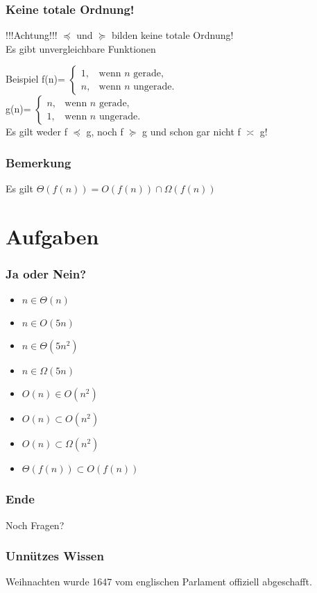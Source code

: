 \documentclass{beamer}
\begin{document}
\begin{frame}
	\frametitle{Keine totale Ordnung!}
	\begin{block}{!!!Achtung!!!}
		$\preceq$ und $\succeq$ bilden keine totale Ordnung! \\
		Es gibt unvergleichbare Funktionen
	\end{block}
	\begin{block}{Beispiel}
		f(n)=
		$\begin{cases}
			1,  & \text{wenn }n\text{ gerade,}\\
 		 	n, & \text{wenn }n\text{ ungerade.}
		\end{cases}$ \\
		g(n)=
		$\begin{cases}
			n,  & \text{wenn }n\text{ gerade,}\\
 		 	1, & \text{wenn }n\text{ ungerade.}
		\end{cases}$ \\
		Es gilt weder f $\preceq$ g, noch f $\succeq$ g und schon gar nicht f $\asymp$ g!
	\end{block}
\end{frame}

\begin{frame}
	\frametitle{Bemerkung}
	\begin{block}{Es gilt}
		$\Theta(f(n)) = O(f(n)) \cap \Omega(f(n))$ 
	\end{block}
\end{frame}

\section{Aufgaben}
\begin{frame}
	\frametitle{Ja oder Nein?}
	\begin{itemize}
		\item $n \in \Theta(n)$ \pause
		\item $n \in O(5n)$\pause
		\item $n \in \Theta(5n^2)$\pause
		\item $n \in \Omega(5n)$\pause
		\item $O(n) \in O(n^2)$\pause
		\item $O(n) \subset O(n^2)$\pause
		\item $O(n) \subset \Omega(n^2)$\pause
		\item $\Theta(f(n)) \subset O(f(n))$
	\end{itemize}
\end{frame}

\begin {frame}
\frametitle {Ende}
	\begin {center}
		Noch Fragen?
	\end {center}
\end {frame}

\begin {frame}
\frametitle {Unnützes Wissen}
	\begin {center}
		Weihnachten wurde 1647 vom englischen Parlament offiziell abgeschafft.
	\end {center}
\end {frame}
\end{document}
